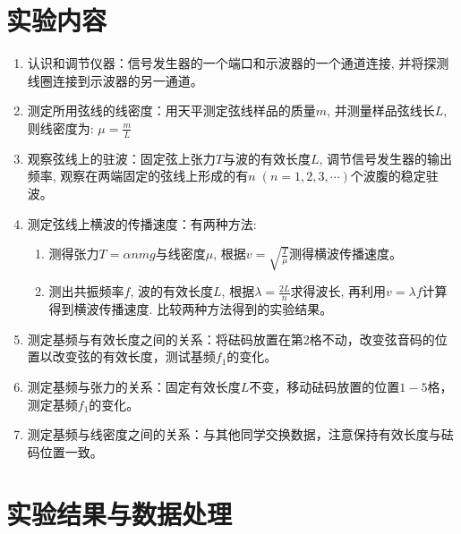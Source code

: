\documentclass[11pt]{article}
\begin{document}
\section{实验内容}

\begin{enumerate}
	
	\item 认识和调节仪器：信号发生器的一个端口和示波器的一个通道连接, 并将探测线圈连接到示波器的另一通道。 
	
	\item 测定所用弦线的线密度：用天平测定弦线样品的质量$m$, 并测量样品弦线长$L$, 则线密度为: $\mu=\frac mL$
	
	\item 观察弦线上的驻波：固定弦上张力$T$与波的有效长度$L$, 调节信号发生器的输出频率, 观察在两端固定的弦线上形成的有$n\; (n=1,2,3,\cdots)$个波腹的稳定驻波。
	
	\item 测定弦线上横波的传播速度：有两种方法: 
	\begin{enumerate}
		\item 测得张力$T = \alpha nmg$与线密度$\mu$, 根据$v=\sqrt{\frac T\mu}$测得横波传播速度。
		\item 测出共振频率$f$, 波的有效长度$L$, 根据$\lambda=\frac{2L}{n}$求得波长, 再利用$v=\lambda f$计算得到横波传播速度. 比较两种方法得到的实验结果。
	\end{enumerate}  
	
	\item 测定基频与有效长度之间的关系：将砝码放置在第2格不动，改变弦音码的位置以改变弦的有效长度，测试基频\(f_1\)的变化。
	
	\item 测定基频与张力的关系：固定有效长度\(L\)不变，移动砝码放置的位置\(1-5\)格，测定基频\(f_1\)的变化。
	
	\item 测定基频与线密度之间的关系：与其他同学交换数据，注意保持有效长度与砝码位置一致。
	

\end{enumerate}

\section{实验结果与数据处理}
\end{document}
